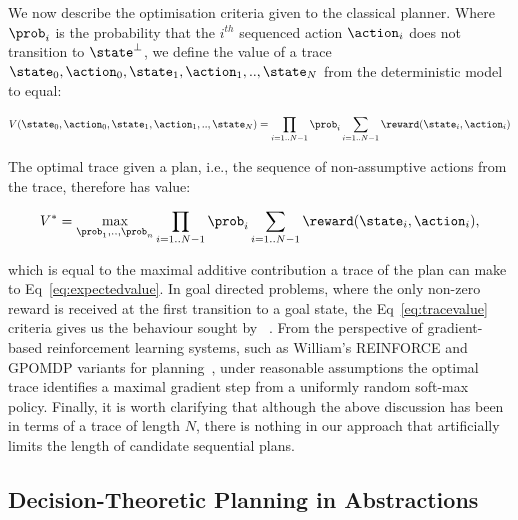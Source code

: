 \documentclass{article}
\begin{document}




We now describe the optimisation criteria given to the classical
planner. Where $\prob_i$ is the probability that the $i^{th}$
sequenced action $\action_i$ does not transition to $\state^\bot$, we
define the value of a trace
$\state_0, \action_0, \state_1, \action_1,.., \state_N$ from the
deterministic model to equal:

\begin{equation}\label{eq:tracevalue}
V(\state_0, \action_0, \state_1, \action_1,.., \state_N) =  \prod_{i=1..N-1} \prob_i \sum_{i=1..N-1} \reward(\state_i, \action_i)
\end{equation}

\noindent The optimal trace given a plan, i.e., the sequence of non-assumptive
actions from the trace, therefore has value:

\[
V^* = \max_{\prob_1, .., \prob_n} \prod_{i=1..N-1} \prob_i \sum_{i=1..N-1}
\reward(\state_i, \action_i),
\]

\noindent which is equal to the maximal 
additive contribution a trace of the plan can make to
Eq~\ref{eq:expectedvalue}.  In goal directed problems, where the only
non-zero reward is received at the first transition to a goal state,
the Eq~\ref{eq:tracevalue} criteria gives us the behaviour sought
by ~\cite{yoon:etal:2007}. From the perspective of
gradient-based reinforcement learning systems, such as William's
REINFORCE and GPOMDP variants for planning~\cite{olivier:doug:2009},
under reasonable assumptions the optimal trace identifies a maximal
gradient step from a uniformly random soft-max policy. Finally, it is
worth clarifying that although the above discussion has been in terms
of a trace of length $N$, there is nothing in our approach that
artificially limits the length of candidate sequential plans.


\subsection{Decision-Theoretic Planning in Abstractions}
\end{document}
